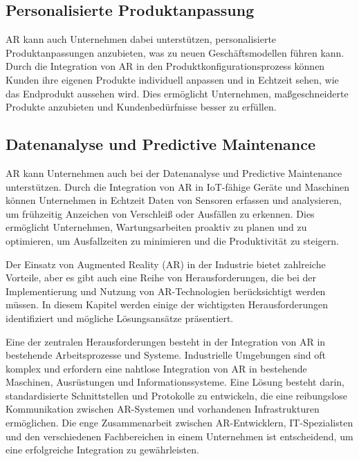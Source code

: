 \subsection{Personalisierte Produktanpassung}
AR kann auch Unternehmen dabei unterstützen, personalisierte Produktanpassungen
anzubieten, was zu neuen Geschäftsmodellen führen kann. Durch die Integration
von AR in den Produktkonfigurationsprozess können Kunden ihre eigenen Produkte
individuell anpassen und in Echtzeit sehen, wie das Endprodukt aussehen wird.
Dies ermöglicht Unternehmen, maßgeschneiderte Produkte anzubieten und
Kundenbedürfnisse besser zu erfüllen.

\subsection{Datenanalyse und Predictive Maintenance}
AR kann Unternehmen auch bei der Datenanalyse und Predictive Maintenance
unterstützen. Durch die Integration von AR in IoT-fähige Geräte und Maschinen
können Unternehmen in Echtzeit Daten von Sensoren erfassen und analysieren, um
frühzeitig Anzeichen von Verschleiß oder Ausfällen zu erkennen. Dies ermöglicht
Unternehmen, Wartungsarbeiten proaktiv zu planen und zu optimieren, um
Ausfallzeiten zu minimieren und die Produktivität zu steigern.

Der Einsatz von Augmented Reality (AR) in der Industrie bietet zahlreiche
Vorteile, aber es gibt auch eine Reihe von Herausforderungen, die bei der
Implementierung und Nutzung von AR-Technologien berücksichtigt werden müssen.
In diesem Kapitel werden einige der wichtigsten Herausforderungen identifiziert
und mögliche Lösungsansätze präsentiert.

Eine der zentralen Herausforderungen besteht in der Integration von AR in
bestehende Arbeitsprozesse und Systeme. Industrielle Umgebungen sind oft
komplex und erfordern eine nahtlose Integration von AR in bestehende Maschinen,
Ausrüstungen und Informationssysteme. Eine Lösung besteht darin,
standardisierte Schnittstellen und Protokolle zu entwickeln, die eine
reibungslose Kommunikation zwischen AR-Systemen und vorhandenen Infrastrukturen
ermöglichen. Die enge Zusammenarbeit zwischen AR-Entwicklern, IT-Spezialisten
und den verschiedenen Fachbereichen in einem Unternehmen ist entscheidend, um
eine erfolgreiche Integration zu gewährleisten.